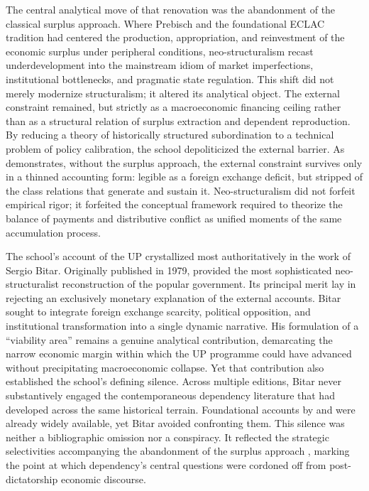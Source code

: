 The central analytical move of that renovation was the abandonment of the classical 
surplus approach. Where Prebisch and the foundational ECLAC tradition had centered the production, 
appropriation, and reinvestment of the economic surplus under peripheral conditions, neo-structuralism 
recast underdevelopment into the mainstream idiom of market imperfections, institutional bottlenecks, 
and pragmatic state regulation. This shift did not merely modernize structuralism; it altered its 
analytical object. The external constraint remained, but strictly as a macroeconomic financing ceiling 
rather than as a structural relation of surplus extraction and dependent reproduction. By reducing a 
theory of historically structured subordination to a technical problem of policy calibration, the 
school depoliticized the external barrier. As \citet{Leiva2008} demonstrates, without the surplus 
approach, the external constraint survives only in a thinned accounting form: legible as a foreign 
exchange deficit, but stripped of the class relations that generate and sustain it. Neo-structuralism 
did not forfeit empirical rigor; it forfeited the conceptual framework required to theorize the 
balance of payments and distributive conflict as unified moments of the same accumulation process.

The school's account of the UP crystallized most authoritatively in the work of Sergio Bitar. 
Originally published in 1979, \citet{Bitar2013} provided the most sophisticated neo-structuralist 
reconstruction of the popular government. Its principal merit lay in rejecting an exclusively monetary 
explanation of the external accounts. Bitar sought to integrate foreign exchange scarcity, political 
opposition, and institutional transformation into a single dynamic narrative. His formulation of a 
``viability area'' remains a genuine analytical contribution, demarcating the narrow economic margin 
within which the UP programme could have advanced without precipitating macroeconomic collapse. Yet 
that contribution also established the school's defining silence. Across multiple editions, Bitar never 
substantively engaged the contemporaneous dependency literature that had developed across the same 
historical terrain. Foundational accounts by \citet{DeVylder1976} and \citet{Stallings1978} were already 
widely available, yet Bitar avoided confronting them. This silence was neither a bibliographic omission 
nor a conspiracy. It reflected the strategic selectivities accompanying the abandonment of the surplus 
approach \citep{Leiva2008}, marking the point at which dependency's central questions were cordoned 
off from post-dictatorship economic discourse.

